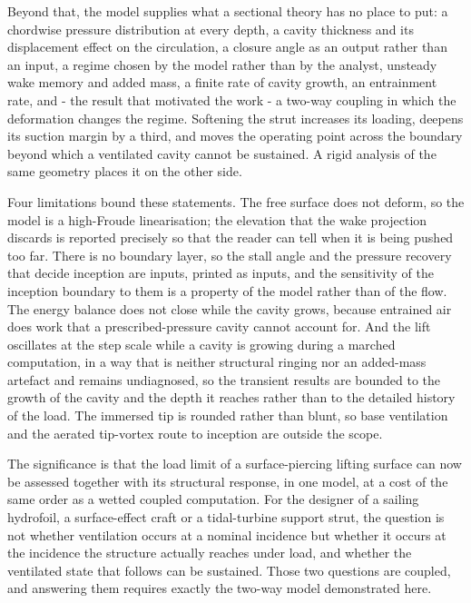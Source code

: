 \documentclass[11pt,a4paper]{article}
\begin{document}
Beyond that, the model supplies what a sectional theory has no place to put: a
chordwise pressure distribution at every depth, a cavity thickness and its
displacement effect on the circulation, a closure angle as an output rather than
an input, a regime chosen by the model rather than by the analyst, unsteady wake
memory and added mass, a finite rate of cavity growth, an entrainment rate, and -
the result that motivated the work - a two-way coupling in which the deformation
changes the regime. Softening the strut increases its loading, deepens its
suction margin by a third, and moves the operating point across the
boundary beyond which a ventilated cavity cannot be sustained. A rigid analysis
of the same geometry places it on the other side.

Four limitations bound these statements. The free surface does not deform, so the
model is a high-Froude linearisation; the elevation that the wake projection
discards is reported precisely so that the reader can tell when it is being
pushed too far. There is no boundary layer, so the stall angle and the pressure
recovery that decide inception are inputs, printed as inputs, and the sensitivity
of the inception boundary to them is a property of the model rather than of the
flow. The energy balance does not close while the cavity grows, because entrained
air does work that a prescribed-pressure cavity cannot account for. And the lift
oscillates at the step scale while a cavity is growing during a marched
computation, in a way that is neither structural ringing nor an added-mass
artefact and remains undiagnosed, so the transient results are bounded to the
growth of the cavity and the depth it reaches rather than to the detailed history
of the load. The immersed tip is rounded rather than blunt, so base ventilation
and the aerated tip-vortex route to inception are outside the scope.

The significance is that the load limit of a surface-piercing lifting surface can
now be assessed together with its structural response, in one model, at a cost of
the same order as a wetted coupled computation. For the designer of a sailing
hydrofoil, a surface-effect craft or a tidal-turbine support strut, the question
is not whether ventilation occurs at a nominal incidence but whether it occurs at
the incidence the structure actually reaches under load, and whether the
ventilated state that follows can be sustained. Those two questions are coupled,
and answering them requires exactly the two-way model demonstrated here.
\end{document}
